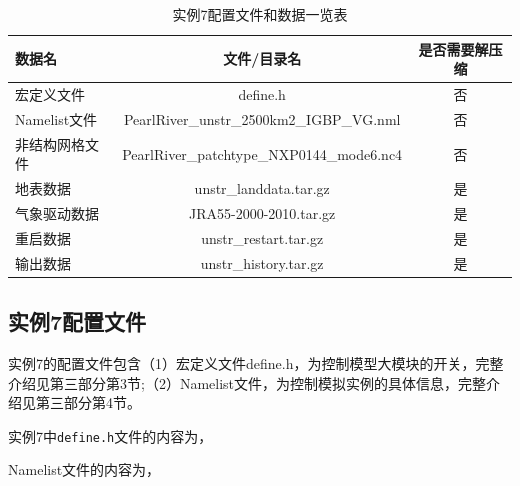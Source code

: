 \begin{table}[htbp]
\caption{实例7配置文件和数据一览表}
\centering \renewcommand{\arraystretch}{1.5}
\label{ex7table}
\begin{tabular}{lcc}
\toprule
\textbf{数据名} & \textbf{文件/目录名} & \textbf{是否需要解压缩} \\\midrule
宏定义文件 & define.h & 否 \\
Namelist文件 & PearlRiver\_unstr\_2500km2\_IGBP\_VG.nml & 否 \\
非结构网格文件 & PearlRiver\_patchtype\_NXP0144\_mode6.nc4 & 否\\
地表数据 & unstr\_landdata.tar.gz & 是 \\
气象驱动数据 & JRA55-2000-2010.tar.gz & 是 \\
重启数据 & unstr\_restart.tar.gz & 是 \\
输出数据 & unstr\_history.tar.gz & 是 \\

\bottomrule
\end{tabular}
\end{table}
\subsection{实例7配置文件}\label{ex7config}
实例7的配置文件包含（1）宏定义文件define.h，为控制模型大模块的开关，完整介绍见第三部分第3节;（2）Namelist文件，为控制模拟实例的具体信息，完整介绍见第三部分第4节。

实例7中\texttt{define.h}文件的内容为，


Namelist文件的内容为，


